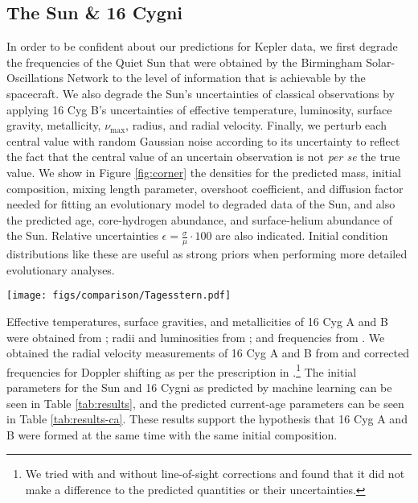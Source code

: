 \documentclass[manuscript]{aastex}
\begin{document}
\subsection{The Sun \& 16 Cygni}
In order to be confident about our predictions for Kepler data, we first degrade the frequencies of the Quiet Sun that were obtained by the Birmingham Solar-Oscillations Network \citep[BiSON,][]{2014MNRAS.439.2025D} to the level of information that is achievable by the spacecraft. We also degrade the Sun's uncertainties of classical observations by applying 16 Cyg B's uncertainties of effective temperature, luminosity, surface gravity, metallicity, $\nu_{\max}$, radius, and radial velocity. Finally, we perturb each central value with random Gaussian noise according to its uncertainty to reflect the fact that the central value of an uncertain observation is not \emph{per se} the true value. We show in Figure \ref{fig:corner} the densities for the predicted mass, initial composition, mixing length parameter, overshoot coefficient, and diffusion factor needed for fitting an evolutionary model to degraded data of the Sun, and also the predicted age, core-hydrogen abundance, and surface-helium abundance of the Sun. Relative uncertainties $\epsilon = \frac{\sigma}{\mu}\cdot 100$ are also indicated. Initial condition distributions like these are useful as strong priors when performing more detailed evolutionary analyses. 

\begin{figure*}
    \centering
    \texttt{[image: figs/comparison/Tagesstern.pdf]}
    \caption{Predictions from machine learning of initial (top six) and current-age (bottom three) stellar parameters for degraded solar data. Labels are placed at the mean and 3$\sigma$ levels. Dotted lines indicate the median and quartiles. Relative uncertainties $\epsilon$ are shown beside each plot. }
    \label{fig:corner}
\end{figure*}

Effective temperatures, surface gravities, and metallicities of 16 Cyg A and B were obtained from \citet{2009A&A...508L..17R}; radii and luminosities from \citet{2013MNRAS.433.1262W}; and frequencies from \citet{2015MNRAS.446.2959D}. We obtained the radial velocity measurements of 16 Cyg A and B from \citet{2002ApJS..141..503N} and corrected frequencies for Doppler shifting as per the prescription in \citet{2014MNRAS.445L..94D}.\footnote{We tried with and without line-of-sight corrections and found that it did not make a difference to the predicted quantities or their uncertainties.} The initial parameters for the Sun and 16 Cygni as predicted by machine learning can be seen in Table \ref{tab:results}, and the predicted current-age parameters can be seen in Table \ref{tab:results-ca}. These results support the hypothesis that 16 Cyg A and B were formed at the same time with the same initial composition. 
\end{document}
